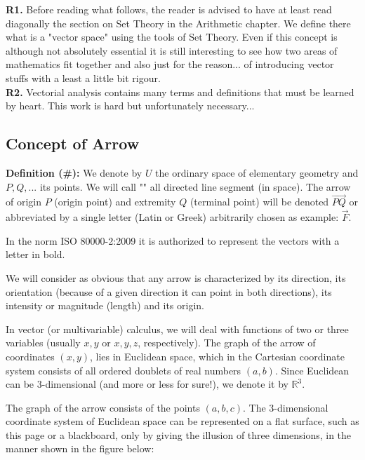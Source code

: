 	\begin{tcolorbox}[title=Remarks,colframe=black,arc=10pt]
	\textbf{R1.} Before reading what follows, the reader is advised to have at least read diagonally the section on Set Theory in the Arithmetic chapter. We define there what is a "vector space" using the tools of Set Theory. Even if this concept  is although not absolutely essential it is still interesting to see how two areas of mathematics fit together and also just for the reason... of introducing vector stuffs with a least a little bit rigour.\\
	
	\textbf{R2.} Vectorial analysis contains many terms and definitions that must be learned by heart. This work is hard but unfortunately necessary...
	\end{tcolorbox}
	
	\pagebreak
	\subsection{Concept of Arrow}	

\textbf{Definition (\#\mydef):} We denote by $U$ the ordinary space of elementary geometry and $P, Q,...$ its points. We will call "" all directed line segment (in space). The arrow of origin $P$ (origin point) and extremity $Q$ (terminal point) will be denoted $\overrightarrow{PQ}$ or abbreviated by a single letter (Latin or Greek) arbitrarily chosen as example: $\overrightarrow{F}$.

	\begin{tcolorbox}[title=Remark,colframe=black,arc=10pt]
In the norm ISO 80000-2:2009 it is authorized to represent the vectors with a letter in bold.
	\end{tcolorbox}	

We will consider as obvious that any arrow is characterized by its direction, its orientation (because of a given direction it can point in both directions), its intensity or magnitude (length) and its origin.

In vector (or multivariable) calculus, we will deal with functions of two or three variables (usually $x, y$ or $x, y, z$, respectively). The graph of the arrow of coordinates $(x, y)$, lies in Euclidean space, which in the Cartesian coordinate system consists of all ordered doublets of real numbers $(a,b)$. Since Euclidean can be 3-dimensional (and more or less for sure!), we denote it by $\mathbb{R}^3$.

The graph of the arrow consists of the points $(a, b, c)$. The 3-dimensional coordinate system of Euclidean space can be represented on a flat surface, such as this page or a blackboard, only by giving the illusion of three dimensions, in the manner shown in the figure below:

